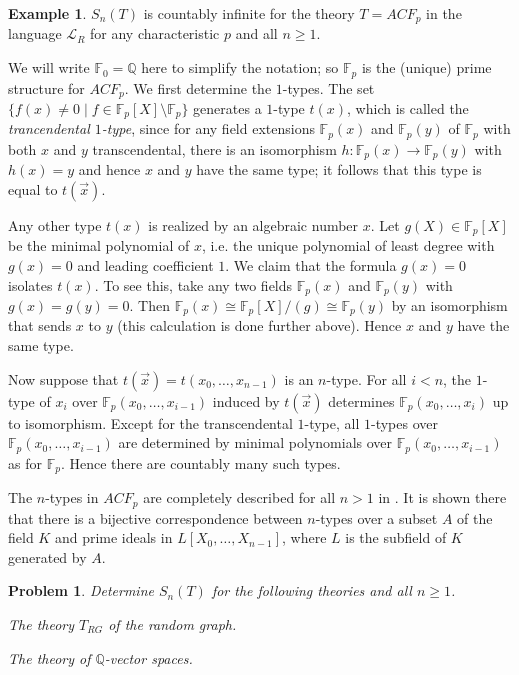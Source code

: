 \documentclass[10pt]{amsart}
\renewcommand{\L}{\mathcal{L}}
\newcommand{\FF}{\mathbb{F}}
\newcommand{\QQ}{\mathbb{Q}}
\newtheorem{problem}[theorem]{Problem}
\theoremstyle{definition}
\newtheorem{example}[theorem]{Example}
\theoremstyle{remark}
\newenvironment{enumerate-(a)}{\begin{enumerate}[label={\upshape (\alph*)}, leftmargin=2pc]}{\end{enumerate}}
\begin{document}
\begin{example} \label{example: types in algebraically closed fields} 
$S_n(T)$ is countably infinite for the theory $T=ACF_p$ in the language $\L_R$ for any characteristic $p$ and all $n\geq1$. 

We will write $\FF_0=\QQ$ here to simplify the notation; so $\FF_p$ is the (unique) prime structure for $ACF_p$.  We first determine the $1$-types. The set $\{f(x)\neq 0\mid f\in \FF_p[X]\setminus \FF_p\}$ generates a $1$-type $t(x)$, 
which is called the \emph{trancendental $1$-type}, 
since for any field extensions $\FF_p(x)$ and $\FF_p(y)$ of $\FF_p$ with both $x$ and $y$ transcendental, there is an isomorphism $h\colon \FF_p(x)\rightarrow \FF_p(y)$ with $h(x)=y$ and hence $x$ and $y$ have the same type; it follows that this type is equal to $t(\vec{x})$.  

Any other type $t(x)$ is realized by an algebraic number $x$. Let $g(X)\in\FF_p[X]$ be the minimal polynomial of $x$, i.e. the unique polynomial of least degree with $g(x)=0$ and leading coefficient $1$. We claim that the formula $g(x)=0$ isolates $t(x)$. To see this, take any two fields $\FF_p(x)$ and $\FF_p(y)$ with $g(x)=g(y)=0$. Then $\FF_p(x)\cong \FF_p[X]/(g)\cong \FF_p(y)$ by an isomorphism that sends $x$ to $y$ (this calculation is done further above). Hence $x$ and $y$ have the same type. 

Now suppose that $t(\vec{x})=t(x_0,\dots,x_{n-1})$ is an $n$-type. For all $i< n$, the $1$-type of $x_i$ over $\FF_p(x_0,\dots,x_{i-1})$ induced by $t(\vec{x})$ determines $\FF_p(x_0,\dots,x_i)$ up to isomorphism. Except for the transcendental $1$-type, all $1$-types over $\FF_p(x_0,\dots,x_{i-1})$ are determined by minimal polynomials over $\FF_p(x_0,\dots,x_{i-1})$ as for $\FF_p$. Hence there are countably many such types. 
\end{example} 

The $n$-types in $ACF_p$ are completely described for all $n>1$ in \cite[Example 4.1.14]{MR1924282}. It is shown there that there is a bijective correspondence between $n$-types over a subset $A$ of the field $K$ and prime ideals in $L[X_0,\dots,X_{n-1}]$, where $L$ is the subfield of $K$ generated by $A$. 

\begin{problem} 
Determine $S_n(T)$ for the following theories and all $n\geq1$. 
\begin{enumerate-(a)} 
\item 
The theory $T_{RG}$ of the random graph. 
\item 
The theory of $\QQ$-vector spaces. 
\end{enumerate-(a)} 
\end{problem} 
\end{document}
